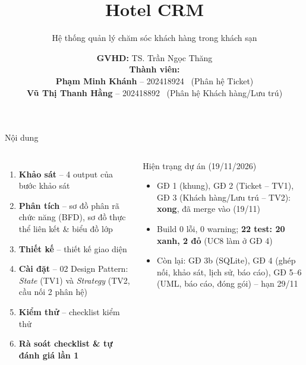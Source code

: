 \documentclass[aspectratio=169,10pt]{beamer}
\title{Hotel CRM}
\subtitle{Hệ thống quản lý chăm sóc khách hàng trong khách sạn}
\author[Phạm Minh Khánh, Vũ Thị Thanh Hằng]{%
  \textbf{GVHD:} TS. Trần Ngọc Thăng\\[3mm]
  \textbf{Thành viên:}\\[1mm]
  \textcolor{tvA}{\textbf{Phạm Minh Khánh}} -- 202418924 \ (Phân hệ Ticket)\\[1mm]
  \textcolor{tvB}{\textbf{Vũ Thị Thanh Hằng}} -- 202418892 \ (Phân hệ Khách hàng/Lưu trú)}
\date{}
\institute{\small\textbf{GitHub:} \href{https://github.com/Kessential/Hotel-CRM}{\texttt{github.com/Kessential/Hotel-CRM}}}
\newcommand{\code}[1]{\texttt{\detokenize{#1}}}
\begin{document}
\maketitle

\begin{frame}{Nội dung}
\begin{columns}[T]
\begin{enumerate}
  \item \textbf{Khảo sát} -- 4 output của bước khảo sát
  \item \textbf{Phân tích} -- sơ đồ phân rã chức năng (BFD), sơ đồ thực thể liên kết \& biểu đồ lớp
  \item \textbf{Thiết kế} -- thiết kế giao diện
  \item \textbf{Cài đặt} -- 02 Design Pattern: \emph{State} (TV1) và \emph{Strategy} (TV2, cầu nối 2 phân hệ)
  \item \textbf{Kiểm thử} -- checklist kiểm thử
  \item \textbf{Rà soát checklist \& tự đánh giá lần 1}
\end{enumerate}
\begin{block}{Hiện trạng dự án (19/11/2026)}
\small
\begin{itemize}
  \item GĐ 1 (khung), GĐ 2 (Ticket -- TV1), GĐ 3 (Khách hàng/Lưu trú -- TV2): \textbf{xong}, đã merge vào \code{develop} (19/11)
  \item Build 0 lỗi, 0 warning; \textbf{22 test: 20 xanh, 2 đỏ} (UC8 làm ở GĐ 4)
  \item Còn lại: GĐ 3b (SQLite), GĐ 4 (ghép nối, khảo sát, lịch sử, báo cáo), GĐ 5--6 (UML, báo cáo, đóng gói) -- hạn 29/11
\end{itemize}
\end{block}
\end{columns}
\end{frame}







\end{document}
